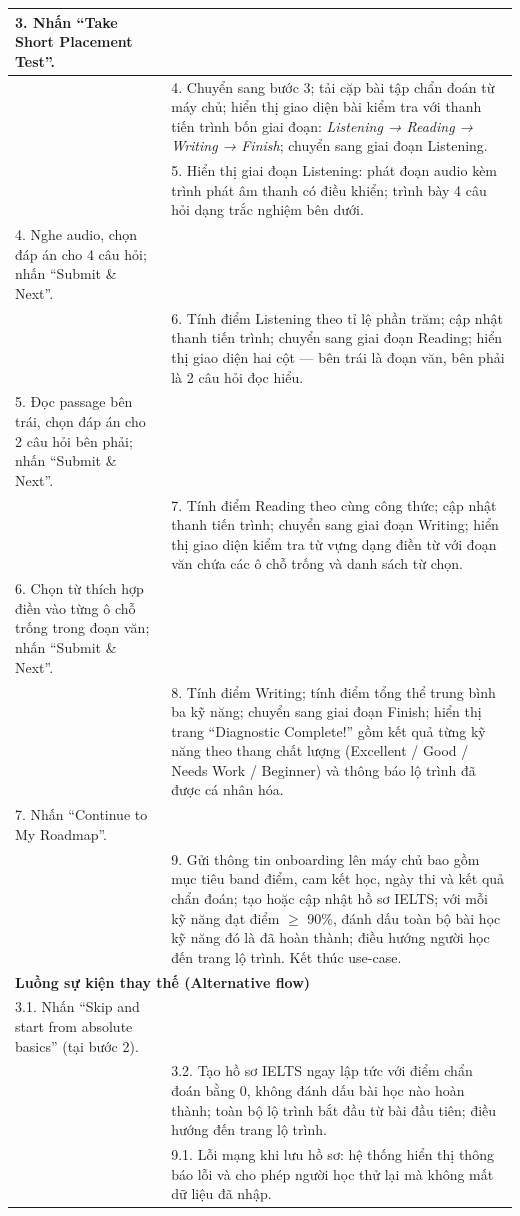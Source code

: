 \begin{longtable}{|p{\tbu}|p{\tbu}|}
    3. Nhấn ``Take Short Placement Test''. & \\ \hline
    & 4. Chuyển sang bước 3; tải cặp bài tập chẩn đoán từ máy chủ; hiển thị giao diện bài kiểm tra với thanh tiến trình bốn giai đoạn: \textit{Listening → Reading → Writing → Finish}; chuyển sang giai đoạn Listening. \\ \hline
    & 5. Hiển thị giai đoạn Listening: phát đoạn audio kèm trình phát âm thanh có điều khiển; trình bày 4 câu hỏi dạng trắc nghiệm bên dưới. \\ \hline
    4. Nghe audio, chọn đáp án cho 4 câu hỏi; nhấn ``Submit \& Next''. & \\ \hline
    & 6. Tính điểm Listening theo tỉ lệ phần trăm; cập nhật thanh tiến trình; chuyển sang giai đoạn Reading; hiển thị giao diện hai cột --- bên trái là đoạn văn, bên phải là 2 câu hỏi đọc hiểu. \\ \hline
    5. Đọc passage bên trái, chọn đáp án cho 2 câu hỏi bên phải; nhấn ``Submit \& Next''. & \\ \hline
    & 7. Tính điểm Reading theo cùng công thức; cập nhật thanh tiến trình; chuyển sang giai đoạn Writing; hiển thị giao diện kiểm tra từ vựng dạng điền từ với đoạn văn chứa các ô chỗ trống và danh sách từ chọn. \\ \hline
    6. Chọn từ thích hợp điền vào từng ô chỗ trống trong đoạn văn; nhấn ``Submit \& Next''. & \\ \hline
    & 8. Tính điểm Writing; tính điểm tổng thể trung bình ba kỹ năng; chuyển sang giai đoạn Finish; hiển thị trang ``Diagnostic Complete!'' gồm kết quả từng kỹ năng theo thang chất lượng (Excellent / Good / Needs Work / Beginner) và thông báo lộ trình đã được cá nhân hóa. \\ \hline
    7. Nhấn ``Continue to My Roadmap''. & \\ \hline
    & 9. Gửi thông tin onboarding lên máy chủ bao gồm mục tiêu band điểm, cam kết học, ngày thi và kết quả chẩn đoán; tạo hoặc cập nhật hồ sơ IELTS; với mỗi kỹ năng đạt điểm $\geq$ 90\%, đánh dấu toàn bộ bài học kỹ năng đó là đã hoàn thành; điều hướng người học đến trang lộ trình. Kết thúc use-case. \\ \hline
    \multicolumn{2}{|l|}{\textbf{Luồng sự kiện thay thế (Alternative flow)}} \\ \hline
    3.1. Nhấn ``Skip and start from absolute basics'' (tại bước 2). & \\ \hline
    & 3.2. Tạo hồ sơ IELTS ngay lập tức với điểm chẩn đoán bằng 0, không đánh dấu bài học nào hoàn thành; toàn bộ lộ trình bắt đầu từ bài đầu tiên; điều hướng đến trang lộ trình. \\ \hline
    & 9.1. Lỗi mạng khi lưu hồ sơ: hệ thống hiển thị thông báo lỗi và cho phép người học thử lại mà không mất dữ liệu đã nhập. \\ \hline
\end{longtable}

